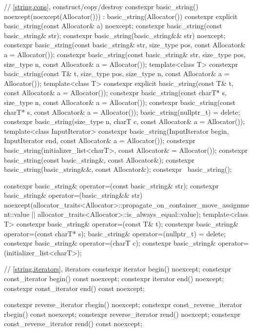 \begin{codeblock}
{{    // \ref{string.cons}, construct/copy/destroy
    constexpr basic_string() noexcept(noexcept(Allocator())) : basic_string(Allocator()) { }
    constexpr explicit basic_string(const Allocator& a) noexcept;
    constexpr basic_string(const basic_string& str);
    constexpr basic_string(basic_string&& str) noexcept;
    constexpr basic_string(const basic_string& str, size_type pos,
                           const Allocator& a = Allocator());
    constexpr basic_string(const basic_string& str, size_type pos, size_type n,
                           const Allocator& a = Allocator());
    template<class T>
      constexpr basic_string(const T& t, size_type pos, size_type n,
                             const Allocator& a = Allocator());
    template<class T>
      constexpr explicit basic_string(const T& t, const Allocator& a = Allocator());
    constexpr basic_string(const charT* s, size_type n, const Allocator& a = Allocator());
    constexpr basic_string(const charT* s, const Allocator& a = Allocator());
    basic_string(nullptr_t) = delete;
    constexpr basic_string(size_type n, charT c, const Allocator& a = Allocator());
    template<class InputIterator>
      constexpr basic_string(InputIterator begin, InputIterator end,
                             const Allocator& a = Allocator());
    constexpr basic_string(initializer_list<charT>, const Allocator& = Allocator());
    constexpr basic_string(const basic_string&, const Allocator&);
    constexpr basic_string(basic_string&&, const Allocator&);
    constexpr ~basic_string();

    constexpr basic_string& operator=(const basic_string& str);
    constexpr basic_string& operator=(basic_string&& str)
      noexcept(allocator_traits<Allocator>::propagate_on_container_move_assignment::value ||
               allocator_traits<Allocator>::is_always_equal::value);
    template<class T>
      constexpr basic_string& operator=(const T& t);
    constexpr basic_string& operator=(const charT* s);
    basic_string& operator=(nullptr_t) = delete;
    constexpr basic_string& operator=(charT c);
    constexpr basic_string& operator=(initializer_list<charT>);

    // \ref{string.iterators}, iterators
    constexpr iterator       begin() noexcept;
    constexpr const_iterator begin() const noexcept;
    constexpr iterator       end() noexcept;
    constexpr const_iterator end() const noexcept;

    constexpr reverse_iterator       rbegin() noexcept;
    constexpr const_reverse_iterator rbegin() const noexcept;
    constexpr reverse_iterator       rend() noexcept;
    constexpr const_reverse_iterator rend() const noexcept;

}}
\end{codeblock}
